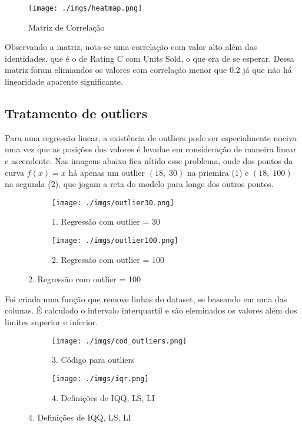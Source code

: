 \documentclass[12pt, a4paper]{article}
\begin{document}
\FloatBarrier
\begin{figure}[h]
\texttt{[image: ./imgs/heatmap.png]}
\caption*{Matriz de Correlação}
\end{figure}
\FloatBarrier 


Observando a matriz, nota-se uma correlação com valor alto além das identidades, que é o de Rating C com Units Sold, o que era de se esperar. Dessa matriz foram elimiandos os valores com correlação menor que 0.2 já que não há linearidade aparente significante.

\subsection{Tratamento de outliers}

Para uma regressão linear, a existência de outliers pode ser especialmente nociva uma vez que as posições dos valores é levadae em consideração de maneira linear e ascendente. Nas imagens abaixo fica nítido esse problema, onde dos pontos da curva $f(x) = x$ há apenas um outlier $(18,\;30)$ na priemira (1) e $(18,\; 100)$ na segunda (2), que jogam a reta do modelo para longe dos outros pontos.\\

\FloatBarrier
\begin{figure}[h]
  \begin{subfigure}[b]{0.4\textwidth}
    \texttt{[image: ./imgs/outlier30.png]}
    \caption*{1. Regressão com outlier = 30}
    \label{fig:1}
  \end{subfigure}\hspace{1.5cm}
  \begin{subfigure}[b]{0.5\textwidth}
    \texttt{[image: ./imgs/outlier100.png]}
    \caption*{2. Regressão com outlier = 100}
    \label{fig:2}
  \end{subfigure}
\end{figure}
\FloatBarrier

Foi criada uma função que remove linhas do dataset, se baseando em uma das colunas. É calculado o intervalo interquartil e são eleminados os valores além dos limites superior e inferior.

\FloatBarrier
\begin{figure}[h]
  \begin{subfigure}[b]{0.4\textwidth}
    \texttt{[image: ./imgs/cod\_outliers.png]}
    \caption*{3. Código para outliers}
    \label{fig:1}
  \end{subfigure}\hspace{1cm}
  \begin{subfigure}[b]{0.5\textwidth}
    \texttt{[image: ./imgs/iqr.png]}
    \caption*{4. Definições de IQQ, LS, LI}
    \label{fig:2}
  \end{subfigure}
\end{figure}
\FloatBarrier
\end{document}
